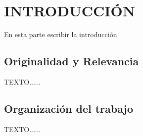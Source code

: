 \chapter{INTRODUCCI\'ON}
\setcounter{page}{11}
\pagestyle{plain}
En esta parte escribir la introducci\'on

\section{Originalidad y Relevancia}
TEXTO......

\section{Organizaci\'on del trabajo}
TEXTO......
